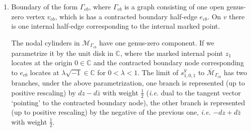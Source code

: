 \documentclass[11pt]{amsart}
\theoremstyle{definition}
\theoremstyle{remark}
\newcommand{\<}{\left<}
\renewcommand{\>}{\right>}
\numberwithin{equation}{section}
\def\Mbar{{\overline{\mathcal M}}}
\begin{document}
\begin{enumerate}
     \item Boundary of the form $\Gamma_{cb}$, where $\Gamma_{cb}$ is a graph consisting of one open genus-zero vertex $v_{cb}$, which is has a contracted boundary half-edge $e_{cb}$. On $v$ there is one internal half-edge corresponding to the internal marked point.

     The nodal cylinders in $\mathcal M_{\Gamma_{cb}}$ have one genus-zero component. If we parametrize it by the unit disk in $\mathbb C$, where the marked internal point $z_1$ locates at the origin $0\in \mathbb C$ and the contracted boundary node corresponding to $e_{cb}$ locates at $\lambda \sqrt{-1} \in \mathbb C$ for $0<\lambda <1$. The limit of $s^y_{1,0,1}$ to $\Mbar_{\Gamma_{cb}}$ has two branches, under the above parametrization, one branch is represented (up to positive rescaling) by $dz-d\bar z$ with weight $\frac{1}{2}$ (\textit{i.e.} dual to the tangent vector `pointing' to the contracted boundary node), the other branch is represented (up to positive rescaling) by the negative of the previous one, \textit{i.e.} $-dz+d\bar z$ with weight $\frac{1}{2}$.
\end{enumerate}
\end{document}
